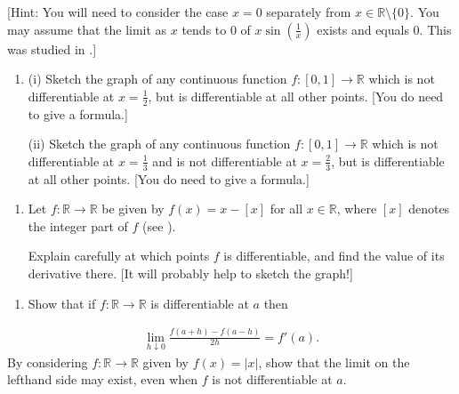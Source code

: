 \documentclass[letterpaper,10pt,english]{jupyterBook}
\begin{document}
{[}Hint: You will need to consider the case \(x=0\) separately from \(x\in\mathbb{R}\setminus\{0\}\). You may assume that the limit as \(x\) tends to \(0\) of \(x\sin\left(\frac{1}{x}\right)\) exists and equals \(0\). This was studied in {\hyperref[\detokenize{Problems:id10}]{}}.{]}

\label{\detokenize{Problems:id43}}\begin{enumerate}
%
\setcounter{enumi}{42}
\item {} 
\sphinxAtStartPar
(i) Sketch the graph of any continuous function \(f:[0,1]\to \mathbb{R}\) which is not differentiable at \(x=\frac{1}{2}\), but is differentiable at all other points. {[}You do  need to give a formula.{]}

\sphinxAtStartPar
(ii) Sketch the graph of any continuous function \(f:[0,1]\to \mathbb{R}\) which is not differentiable at \(x=\frac{1}{3}\) and is not differentiable at \(x=\frac{2}{3}\), but is differentiable at all other points. {[}You do  need to give a formula.{]}

\end{enumerate}
\label{\detokenize{Problems:id44}}\begin{enumerate}
%
\setcounter{enumi}{43}
\item {} 
\sphinxAtStartPar
Let \(f:\mathbb{R}\to \mathbb{R}\) be given by \(f(x) = x - [x]\) for all \(x \in \mathbb{R}\), where \([x]\) denotes the integer part of \(f\) (see {\hyperref[\detokenize{Problems:equation-eq-x}]{}}).

Explain carefully at which points \(f\)  is differentiable, and find the value of its derivative there. {[}It will probably help to sketch the graph!{]}

\end{enumerate}
\label{\detokenize{Problems:id45}}\begin{enumerate}
%
\setcounter{enumi}{44}
\item {} 
\sphinxAtStartPar
Show that if \(f:\mathbb{R} \rightarrow \mathbb{R}\) is differentiable at \(a\) then

\end{enumerate}
\begin{equation*}
\begin{split}
\lim_{h \downarrow 0} \displaystyle\frac{f(a + h) - f(a - h)}{2h} = f'(a).
\end{split}
\end{equation*}
\sphinxAtStartPar
By considering \(f:\mathbb{R}\to\mathbb{R}\) given by \(f(x) = |x|\), show that the limit on the left\sphinxhyphen{}hand side may exist, even when \(f\) is not differentiable at \(a\).
\end{document}
